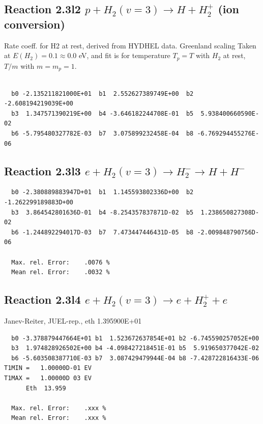 \documentclass[12pt,dvipdfmx]{article}
\begin{document}
\subsection{
Reaction 2.3l2
$ p + H_2(v=3) \rightarrow H + H_2^+$ (ion conversion)
}
Rate coeff. for H2 at rest, derived from HYDHEL data. Greenland scaling
Taken at $E(H_2) = 0.1 \approx 0.0$ eV,  and fit is for temperature $T_p=T$ with $H_2$ at rest,
$T/m$ with $m=m_p=1$.


\begin{small}\begin{verbatim}

  b0 -2.135211821000E+01  b1  2.552627389749E+00  b2 -2.608194219039E+00
  b3  1.347571390219E+00  b4 -3.646182244708E-01  b5  5.938400660590E-02
  b6 -5.795480327782E-03  b7  3.075899232458E-04  b8 -6.769294455276E-06

\end{verbatim}\end{small}

\newpage

\subsection{
Reaction 2.3l3
 $ e + H_2(v=3) \rightarrow H_2^- \rightarrow H + H^-$
}


\begin{small}\begin{verbatim}
  b0 -2.380889883947D+01  b1  1.145593802336D+00  b2 -1.262299189883D+00
  b3  3.864542801636D-01  b4 -8.254357837871D-02  b5  1.238650827308D-02
  b6 -1.244892294017D-03  b7  7.473447446431D-05  b8 -2.009848790756D-06

  Max. rel. Error:    .0076 %
  Mean rel. Error:    .0032 %

\end{verbatim}\end{small}


\subsection{
Reaction 2.3l4
 $ e + H_2(v=3) \rightarrow e + H_2^+  + e $
}
Janev-Reiter, JUEL-rep., eth 1.395900E+01

\begin{small}\begin{verbatim}
  b0 -3.378879447664E+01 b1  1.523672637854E+01 b2 -6.745590257052E+00
  b3  1.974828926502E+00 b4 -4.098427218451E-01 b5  5.919650377042E-02
  b6 -5.603508387710E-03 b7  3.087429479944E-04 b8 -7.428722816433E-06
T1MIN =   1.00000D-01 EV
T1MAX =   1.00000D 03 EV
      Eth  13.959

  Max. rel. Error:    .xxx %
  Mean rel. Error:    .xxx %
\end{verbatim}\end{small}
\end{document}
